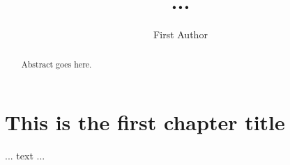 \documentclass[11pt]{afthesis}
\author{First Author}
\title{...}
\begin{document}
%

\flyleaf                %

\disclaimerpage                 %

\titlepage          %

\approvalpage                   %

\begin{preface}
\end{preface}

\tableofcontents    %

\listoffigures      %
\listoftables       %
\listofsymbols          %

\listofabbreviations

\begin{abstract}
    Abstract goes here.
\end{abstract}


\chapter{This is the first chapter title} %
    ... text ...        %
\end{document}

